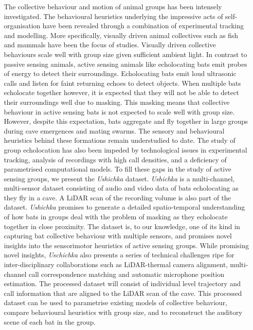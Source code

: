 \documentclass[
]{book}
\begin{document}
The collective behaviour and motion of animal groups has been intensely investigated. The behavioural heuristics underlying the impressive acts of self-organisation have been revealed through a combination of experimental tracking and modelling. More specifically, visually driven animal collectives such as fish and mammals have been the focus of studies. Visually driven collective behaviours scale well with group size given sufficient ambient light. In contrast to passive sensing animals, active sensing animals like echolocating bats emit probes of energy to detect their surroundings. Echolocating bats emit loud ultrasonic calls and listen for faint returning echoes to detect objects. When multiple bats echolocate together however, it is expected that they will not be able to detect their surroundings well due to masking. This masking means that collective behaviour in active sensing bats is not expected to scale well with group size. However, despite this expectation, bats aggregate and fly together in large groups during cave emergences and mating swarms. The sensory and behavioural heuristics behind these formations remain understudied to date. The study of group echolocation has also been impeded by technological issues in experimental tracking, analysis of recordings with high call densities, and a deficiency of parametrised computational models. To fill these gaps in the study of active sensing groups, we present the \emph{Ushichka} dataset. \emph{Ushichka} is a multi-channel, multi-sensor dataset consisting of audio and video data of bats echolocating as they fly in a cave. A LiDAR scan of the recording volume is also part of the dataset. \emph{Ushichka} promises to generate a detailed spatio-temporal understanding of how bats in groups deal with the problem of masking as they echolocate together in close proximity. The dataset is, to our knowledge, one of its kind in capturing bat collective behaviour with multiple sensors, and promises novel insights into the sensorimotor heuristics of active sensing groups. While promising novel insights, \emph{Uschichka} also presents a series of technical challenges ripe for inter-disciplinary collaborations such as LiDAR-thermal camera alignment, multi-channel call correspondence matching and automatic microphone position estimation. The processed dataset will consist of individual level trajectory and call information that are aligned to the LiDAR scan of the cave. This processed dataset can be used to parametrise existing models of collective behaviour, compare behavioural heuristics with group size, and to reconstruct the auditory scene of each bat in the group.
\end{document}
